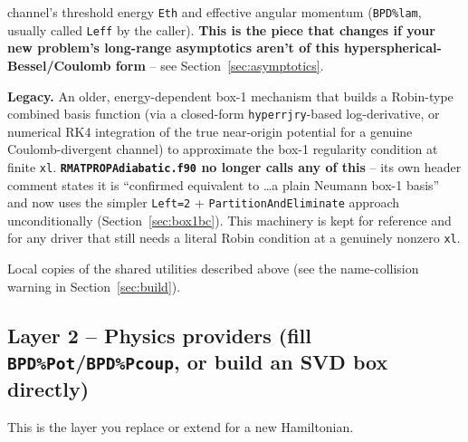 \documentclass[11pt]{article}
\newcommand{\file}[1]{\texttt{#1}}
\newcommand{\sub}[1]{\texttt{#1}}
\begin{document}
\begin{description}
  channel's threshold energy \texttt{Eth} and effective angular momentum (\texttt{BPD\%lam},
  usually called \texttt{Leff} by the caller). \textbf{This is the piece that changes if your new
  problem's long-range asymptotics aren't of this hyperspherical-Bessel/Coulomb form} -- see
  Section~\ref{sec:asymptotics}.
\item[\sub{BuildBox1CombinedBasis}/\sub{CalcGamLamBox1}/\sub{CoulombRegularNumeric}/
  \sub{BuildBox1NeumannBasis}] \textbf{Legacy.} An older, energy-dependent box-1 mechanism that
  builds a Robin-type combined basis function (via a closed-form \sub{hyperrjry}-based
  log-derivative, or numerical RK4 integration of the true near-origin potential for a genuine
  Coulomb-divergent channel) to approximate the box-1 regularity condition at finite \texttt{xl}.
  \textbf{\file{RMATPROPAdiabatic.f90} no longer calls any of this} -- its own header comment
  states it is ``confirmed equivalent to \ldots a plain Neumann box-1 basis'' and now uses the
  simpler \texttt{Left=2} + \sub{PartitionAndEliminate} approach unconditionally
  (Section~\ref{sec:box1bc}). This machinery is kept for reference and for any driver that still
  needs a literal Robin condition at a genuinely nonzero \texttt{xl}.
\item[\sub{GridMaker(grid,numpts,E1,E2,scale)}, \sub{GridMakerLinear(xNumPoints,x1,x2,xPoints)}]
  Local copies of the shared utilities described above (see the name-collision warning in
  Section~\ref{sec:build}).
\end{description}

\subsection{Layer 2 -- Physics providers (fill \texttt{BPD\%Pot}/\texttt{BPD\%Pcoup}, or build an
  SVD box directly)}

This is the layer you replace or extend for a new Hamiltonian.
\end{document}

